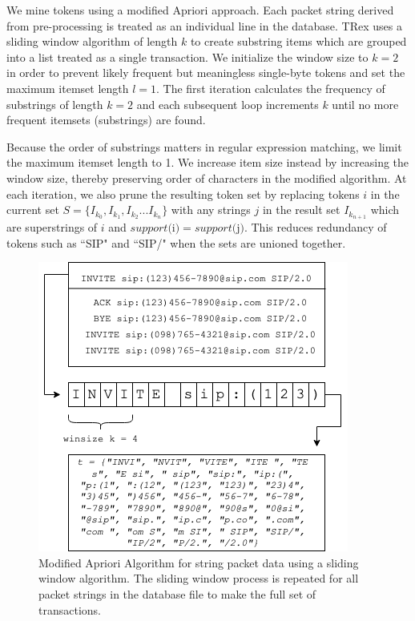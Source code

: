 We mine tokens using a modified Apriori approach. Each packet string derived from pre-processing is treated as an individual line in the database. TRex uses a sliding window algorithm of length $k$ to create substring items which are grouped into a list treated as a single transaction. We initialize the window size to $k=2$ in order to prevent likely frequent but meaningless single-byte tokens and set the maximum itemset length $l=1$. The first iteration calculates the frequency of substrings of length $k=2$ and each subsequent loop increments $k$ until no more frequent itemsets (substrings) are found.

Because the order of substrings matters in regular expression matching, we limit the maximum itemset length to 1. We increase item size instead by increasing the window size, thereby preserving order of characters in the modified algorithm. At each iteration, we also prune the resulting token set by replacing tokens $i$ in the current set $S = \{I_{k_{0}}, I_{k_{1}}, I_{k_{2}}...I_{k_{n}}\}$ with any strings $j$ in the result set $I_{k_{n+1}}$ which are superstrings of $i$ and $ support\text{(i)} = support\text{(j)}$. This reduces redundancy of tokens such as ``SIP" and ``SIP/" when the sets are unioned together.

\begin{figure}[hbt!]
  \begin{center}
    \includegraphics[width=0.7\columnwidth]{chapters/3/img/slidingwindow.png}
    \caption{Modified Apriori Algorithm for string packet data using a sliding window algorithm. The sliding window process is repeated for all packet strings in the database file to make the full set of transactions.}
    \label{f:slidingwindow}
  \end{center}
\end{figure}

